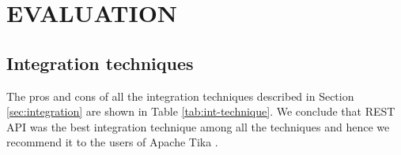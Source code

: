 \section {EVALUATION} \label{sec:evaluation}

\subsection{Integration techniques}
The pros and cons of all the integration techniques described in Section \ref{sec:integration} are shown in Table \ref{tab:int-technique}. We conclude that REST API was the best integration technique among all the techniques and hence we recommend it to the users of Apache Tika \cite{TikaAndVision}.

\newcommand{\tabItem}{\leavevmode\llap{\textbullet~}\raggedright}

